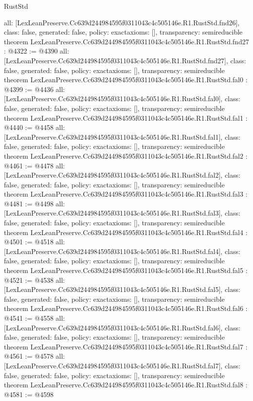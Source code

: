 \begin{lexlean}{RustStd}
\begin{coremodule}
{  all: [LexLeanPreserve.Cc639d244984595f0311043c4c505146e.R1.RustStd.fnd26],
  class: false,
  generated: false,
  policy: exact{axioms: []},
  transparency: semireducible
}
theorem LexLeanPreserve.Cc639d244984595f0311043c4c505146e.R1.RustStd.fnd27 : @4322 := @4390 {
  all: [LexLeanPreserve.Cc639d244984595f0311043c4c505146e.R1.RustStd.fnd27],
  class: false,
  generated: false,
  policy: exact{axioms: []},
  transparency: semireducible
}
theorem LexLeanPreserve.Cc639d244984595f0311043c4c505146e.R1.RustStd.fal0 : @4399 := @4436 {
  all: [LexLeanPreserve.Cc639d244984595f0311043c4c505146e.R1.RustStd.fal0],
  class: false,
  generated: false,
  policy: exact{axioms: []},
  transparency: semireducible
}
theorem LexLeanPreserve.Cc639d244984595f0311043c4c505146e.R1.RustStd.fal1 : @4440 := @4458 {
  all: [LexLeanPreserve.Cc639d244984595f0311043c4c505146e.R1.RustStd.fal1],
  class: false,
  generated: false,
  policy: exact{axioms: []},
  transparency: semireducible
}
theorem LexLeanPreserve.Cc639d244984595f0311043c4c505146e.R1.RustStd.fal2 : @4461 := @4478 {
  all: [LexLeanPreserve.Cc639d244984595f0311043c4c505146e.R1.RustStd.fal2],
  class: false,
  generated: false,
  policy: exact{axioms: []},
  transparency: semireducible
}
theorem LexLeanPreserve.Cc639d244984595f0311043c4c505146e.R1.RustStd.fal3 : @4481 := @4498 {
  all: [LexLeanPreserve.Cc639d244984595f0311043c4c505146e.R1.RustStd.fal3],
  class: false,
  generated: false,
  policy: exact{axioms: []},
  transparency: semireducible
}
theorem LexLeanPreserve.Cc639d244984595f0311043c4c505146e.R1.RustStd.fal4 : @4501 := @4518 {
  all: [LexLeanPreserve.Cc639d244984595f0311043c4c505146e.R1.RustStd.fal4],
  class: false,
  generated: false,
  policy: exact{axioms: []},
  transparency: semireducible
}
theorem LexLeanPreserve.Cc639d244984595f0311043c4c505146e.R1.RustStd.fal5 : @4521 := @4538 {
  all: [LexLeanPreserve.Cc639d244984595f0311043c4c505146e.R1.RustStd.fal5],
  class: false,
  generated: false,
  policy: exact{axioms: []},
  transparency: semireducible
}
theorem LexLeanPreserve.Cc639d244984595f0311043c4c505146e.R1.RustStd.fal6 : @4541 := @4558 {
  all: [LexLeanPreserve.Cc639d244984595f0311043c4c505146e.R1.RustStd.fal6],
  class: false,
  generated: false,
  policy: exact{axioms: []},
  transparency: semireducible
}
theorem LexLeanPreserve.Cc639d244984595f0311043c4c505146e.R1.RustStd.fal7 : @4561 := @4578 {
  all: [LexLeanPreserve.Cc639d244984595f0311043c4c505146e.R1.RustStd.fal7],
  class: false,
  generated: false,
  policy: exact{axioms: []},
  transparency: semireducible
}
theorem LexLeanPreserve.Cc639d244984595f0311043c4c505146e.R1.RustStd.fal8 : @4581 := @4598 {
}
\end{coremodule}
\end{lexlean}
